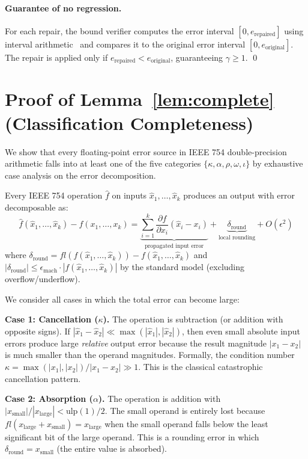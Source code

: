 \documentclass[11pt]{article}
\begin{document}
\paragraph{Guarantee of no regression.}
For each repair, the bound verifier computes the error interval $[0, e_{\text{repaired}}]$ using interval arithmetic~\cite{higham} and compares it to the original error interval $[0, e_{\text{original}}]$. The repair is applied only if $e_{\text{repaired}} < e_{\text{original}}$, guaranteeing $\gamma \geq 1$. \qed

\section{Proof of Lemma~\ref{lem:complete} (Classification Completeness)}

We show that every floating-point error source in IEEE 754 double-precision arithmetic falls into at least one of the five categories $\{\kappa, \alpha, \rho, \omega, \iota\}$ by exhaustive case analysis on the error decomposition.

Every IEEE 754 operation $\hat{f}$ on inputs $\hat{x}_1, \ldots, \hat{x}_k$ produces an output with error decomposable as:
$$\hat{f}(\hat{x}_1, \ldots, \hat{x}_k) - f(x_1, \ldots, x_k) = \underbrace{\sum_{i=1}^k \frac{\partial f}{\partial x_i}(\hat{x}_i - x_i)}_{\text{propagated input error}} + \underbrace{\delta_{\text{round}}}_{\text{local rounding}} + O(\epsilon^2)$$
where $\delta_{\text{round}} = fl(f(\hat{x}_1, \ldots, \hat{x}_k)) - f(\hat{x}_1, \ldots, \hat{x}_k)$ and $|\delta_{\text{round}}| \leq \epsilon_{\text{mach}} \cdot |f(\hat{x}_1, \ldots, \hat{x}_k)|$ by the standard model (excluding overflow/underflow).

We consider all cases in which the total error can become large:

\textbf{Case 1: Cancellation ($\kappa$).} The operation is subtraction (or addition with opposite signs). If $|\hat{x}_1 - \hat{x}_2| \ll \max(|\hat{x}_1|, |\hat{x}_2|)$, then even small absolute input errors produce large \emph{relative} output error because the result magnitude $|x_1 - x_2|$ is much smaller than the operand magnitudes. Formally, the condition number $\kappa = \max(|x_1|, |x_2|) / |x_1 - x_2| \gg 1$. This is the classical catastrophic cancellation pattern.

\textbf{Case 2: Absorption ($\alpha$).} The operation is addition with $|x_{\text{small}}| / |x_{\text{large}}| < \text{ulp}(1)/2$. The small operand is entirely lost because $fl(x_{\text{large}} + x_{\text{small}}) = x_{\text{large}}$ when the small operand falls below the least significant bit of the large operand. This is a rounding error in which $\delta_{\text{round}} = x_{\text{small}}$ (the entire value is absorbed).
\end{document}
